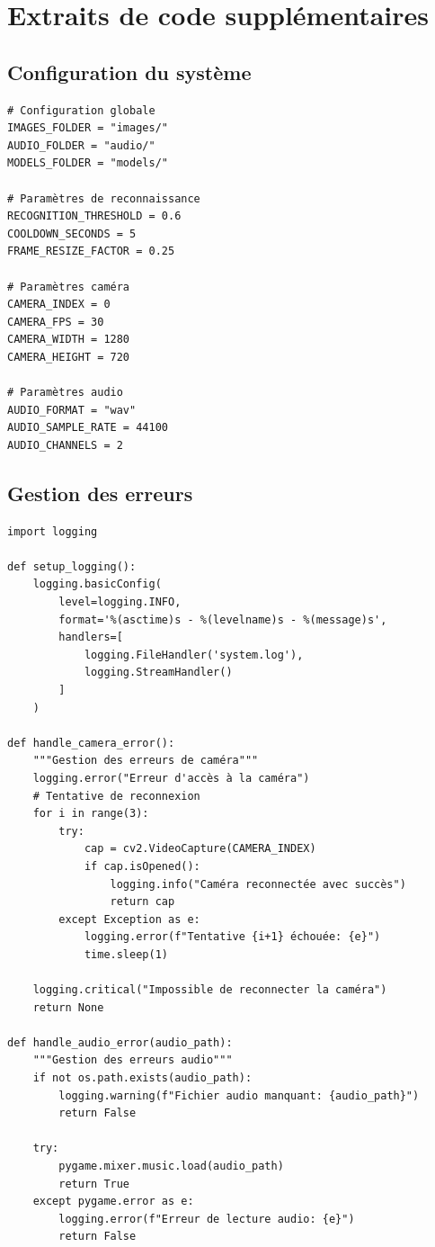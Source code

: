 \documentclass[12pt,a4paper]{article}
\begin{document}
\newpage

\section{Extraits de code supplémentaires}

\subsection{Configuration du système}

\begin{lstlisting}[caption=Configuration générale du système]
# Configuration globale
IMAGES_FOLDER = "images/"
AUDIO_FOLDER = "audio/"
MODELS_FOLDER = "models/"

# Paramètres de reconnaissance
RECOGNITION_THRESHOLD = 0.6
COOLDOWN_SECONDS = 5
FRAME_RESIZE_FACTOR = 0.25

# Paramètres caméra
CAMERA_INDEX = 0
CAMERA_FPS = 30
CAMERA_WIDTH = 1280
CAMERA_HEIGHT = 720

# Paramètres audio
AUDIO_FORMAT = "wav"
AUDIO_SAMPLE_RATE = 44100
AUDIO_CHANNELS = 2
\end{lstlisting}

\subsection{Gestion des erreurs}

\begin{lstlisting}[caption=Système de gestion des erreurs]
import logging

def setup_logging():
    logging.basicConfig(
        level=logging.INFO,
        format='%(asctime)s - %(levelname)s - %(message)s',
        handlers=[
            logging.FileHandler('system.log'),
            logging.StreamHandler()
        ]
    )

def handle_camera_error():
    """Gestion des erreurs de caméra"""
    logging.error("Erreur d'accès à la caméra")
    # Tentative de reconnexion
    for i in range(3):
        try:
            cap = cv2.VideoCapture(CAMERA_INDEX)
            if cap.isOpened():
                logging.info("Caméra reconnectée avec succès")
                return cap
        except Exception as e:
            logging.error(f"Tentative {i+1} échouée: {e}")
            time.sleep(1)
    
    logging.critical("Impossible de reconnecter la caméra")
    return None

def handle_audio_error(audio_path):
    """Gestion des erreurs audio"""
    if not os.path.exists(audio_path):
        logging.warning(f"Fichier audio manquant: {audio_path}")
        return False
    
    try:
        pygame.mixer.music.load(audio_path)
        return True
    except pygame.error as e:
        logging.error(f"Erreur de lecture audio: {e}")
        return False
\end{lstlisting}
\end{document}
